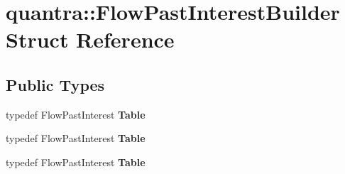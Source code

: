 \hypertarget{structquantra_1_1FlowPastInterestBuilder}{}\section{quantra\+:\+:Flow\+Past\+Interest\+Builder Struct Reference}
\label{structquantra_1_1FlowPastInterestBuilder}
\subsection*{Public Types}
\begin{DoxyCompactItemize}
\item 
\mbox{\label{structquantra_1_1FlowPastInterestBuilder_a95f5d89d498198fed0f49c52217bb924}} 
typedef Flow\+Past\+Interest {\bfseries Table}
\item 
\mbox{\label{structquantra_1_1FlowPastInterestBuilder_a95f5d89d498198fed0f49c52217bb924}} 
typedef Flow\+Past\+Interest {\bfseries Table}
\item 
\mbox{\label{structquantra_1_1FlowPastInterestBuilder_a95f5d89d498198fed0f49c52217bb924}} 
typedef Flow\+Past\+Interest {\bfseries Table}
\end{DoxyCompactItemize}

